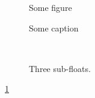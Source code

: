 \documentclass{article}
\begin{document}
\listoffigures

\begin{figure}
Some figure
\caption{Some caption}
\label{fig}
\end{figure}

\begin{figure}
\centering
{}\qquad
{}\\
\caption{Three sub-floats.}
\label{3figs}
\end{figure}

\ref{fig}

\end{document}
